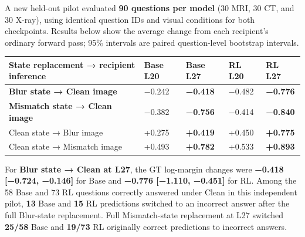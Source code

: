 \documentclass[
  10pt,
  a4paper,
]{article}
\newcounter{none} %
\begin{document}
A new held-out pilot evaluated \textbf{90 questions per model} (30 MRI,
30 CT, and 30 X-ray), using identical question IDs and visual conditions
for both checkpoints. Results below show the average change from each
recipient's ordinary forward pass; 95\% intervals are paired
question-level bootstrap intervals.

{\def\LTcaptype{none} %
\begin{longtable}[]{@{}
  >{\raggedright\arraybackslash}p{}
  >{\raggedleft\arraybackslash}p{}
  >{\raggedleft\arraybackslash}p{}
  >{\raggedleft\arraybackslash}p{}
  >{\raggedleft\arraybackslash}p{}@{}}
\toprule\noalign{}
\begin{minipage}[b]{\linewidth}\raggedright
State replacement → recipient inference
\end{minipage} & \begin{minipage}[b]{\linewidth}\raggedleft
Base L20
\end{minipage} & \begin{minipage}[b]{\linewidth}\raggedleft
Base L27
\end{minipage} & \begin{minipage}[b]{\linewidth}\raggedleft
RL L20
\end{minipage} & \begin{minipage}[b]{\linewidth}\raggedleft
RL L27
\end{minipage} \\
\midrule\noalign{}
\endhead
\bottomrule\noalign{}
\endlastfoot
\textbf{Blur state → Clean image} & −0.242 & \textbf{−0.418} & −0.482 &
\textbf{−0.776} \\
\textbf{Mismatch state → Clean image} & −0.382 & \textbf{−0.756} &
−0.414 & \textbf{−0.840} \\
Clean state → Blur image & +0.275 & \textbf{+0.419} & +0.450 &
\textbf{+0.775} \\
Clean state → Mismatch image & +0.493 & \textbf{+0.782} & +0.533 &
\textbf{+0.893} \\
\end{longtable}
}

For \textbf{Blur state → Clean at L27}, the GT log-margin changes were
\textbf{−0.418 {[}−0.724, −0.146{]}} for Base and \textbf{−0.776
{[}−1.110, −0.451{]}} for RL. Among the 58 Base and 73 RL questions
correctly answered under Clean in this independent pilot, \textbf{13}
Base and \textbf{15} RL predictions switched to an incorrect answer
after the full Blur-state replacement. Full Mismatch-state replacement
at L27 switched \textbf{25/58} Base and \textbf{19/73} RL originally
correct predictions to incorrect answers.
\end{document}
